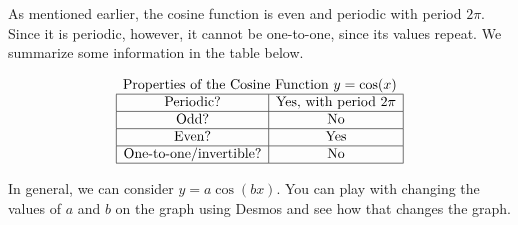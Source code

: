 \documentclass[nooutcomes]{ximera}
\begin{document}
As mentioned earlier, the cosine function is even and periodic with period $2\pi$. Since it is periodic, however, it cannot be one-to-one, since its values repeat. We summarize some information in the table below.

\[
\begin{array}{ c }
 \text{\normalfont Properties of the Cosine Function } y=\cos(x) \\
\begin{array}{|c|c|}
 \hline
\text{Periodic?} & \text{Yes, with period }2\pi \\ \hline
\text{Odd?} & \text{No} \\ \hline
\text{Even?} & \text{Yes} \\ \hline
\text{One-to-one/invertible?} & \text{No} \\ \hline
\end{array}
\end{array}
\]

In general, we can consider $y=a\cos(bx)$.  You can play with changing the values of $a$ and $b$ on the graph using Desmos and see how that changes the graph.  

\begin{center}  
\end{center}
\end{document}
